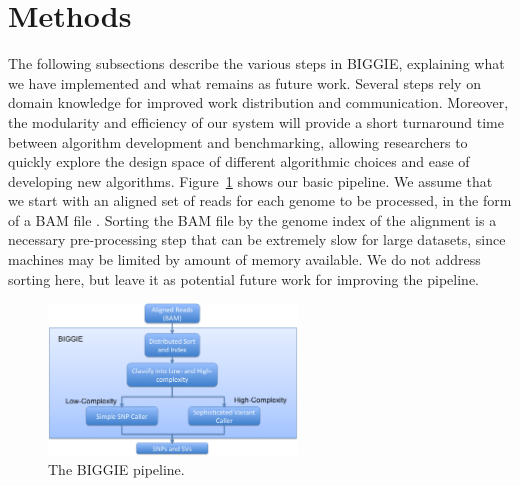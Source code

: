 \documentclass[10pt]{article}
\newcommand\TODO[1]{\textcolor{red}{TODO: #1}}
\begin{document}


\section{Methods}

The following subsections describe the various steps in BIGGIE, explaining what we have implemented and what remains as future work.
Several steps
rely on domain knowledge for improved work distribution and communication.
Moreover, the modularity and efficiency of our system will provide a short 
turnaround time between algorithm development and benchmarking, allowing
researchers to quickly explore the design space of different algorithmic
choices and ease of developing new algorithms. Figure~\ref{fig:pipeline} shows our basic pipeline. We assume that we start with an
aligned set of reads for each genome to be processed, in the form of a BAM file
\cite{samtools}.
Sorting the BAM file by the genome index of the alignment is a necessary pre-processing step that can be extremely slow for large datasets, since machines may be limited by amount of memory available.
We do not address sorting here, but leave it as potential future work for improving the pipeline.

\begin{figure}[h!]
  	\includegraphics[width=2.6in]{figs/pipeline.png}
	\caption{The BIGGIE pipeline.}
	\label{fig:pipeline}
\end{figure}
 
\end{document}
